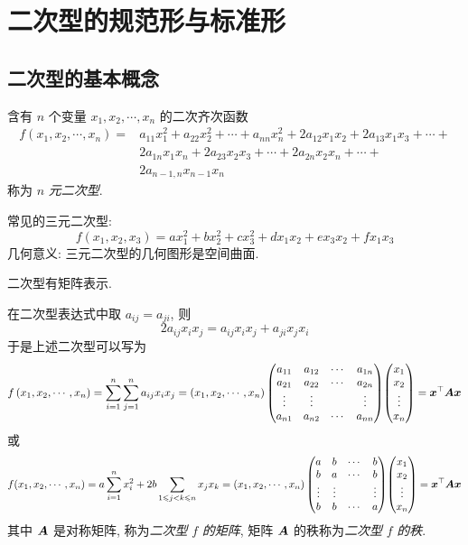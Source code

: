 \section{二次型的规范形与标准形}

\subsection{二次型的基本概念}

\begin{definition}[$n$ 元二次型]
    含有 $ n $ 个变量 $ x_{1}, x_{2}, \cdots, x_{n} $ 的二次齐次函数
    $$\begin{aligned}
            f\left(x_{1}, x_{2}, \cdots, x_{n}\right)= & a_{11} x_{1}^{2}+a_{22} x_{2}^{2}+\cdots+a_{n n} x_{n}^{2}+2 a_{12} x_{1} x_{2}+2 a_{13} x_{1} x_{3}+\cdots+ \\
                                                       & 2 a_{1 n} x_{1} x_{n}+2 a_{23} x_{2} x_{3}+\cdots+2 a_{2 n} x_{2} x_{n}+\cdots+                              \\
                                                       & 2 a_{n-1, n} x_{n-1} x_{n}
        \end{aligned}$$
    称为 $ n $ \textit{元二次型}.
\end{definition}

常见的三元二次型:
$$f\left(x_{1}, x_{2}, x_{3}\right)= a x_{1}^{2}+b x_{2}^{2}+c x_{3}^{2}+d x_{1} x_{2}+e x_{3} x_{2}+f x_{1} x_{3}$$
几何意义: 三元二次型的几何图形是空间曲面.

二次型有矩阵表示.

\begin{definition}[二次型的矩阵表达]
    在二次型表达式中取 $ a_{i j}=a_{j i} $, 则
    $$2 a_{i j} x_{i} x_{j}=a_{i j} x_{i} x_{j}+a_{j i} x_{j} x_{i}$$
    于是上述二次型可以写为
    $$f\left(x_{1}, x_{2}, \cdots, x_{n}\right)=\sum_{i=1}^{n} \sum_{j=1}^{n} a_{i j} x_{i} x_{j}=
        \left(x_{1}, x_{2}, \cdots, x_{n}\right)
        \mqty(a_{11} & a_{12} & \cdots & a_{1 n} \\
        a_{21} & a_{22} & \cdots & a_{2 n} \\
        \vdots & \vdots & & \vdots \\
        a_{n 1} & a_{n 2} & \cdots & a_{n n})
        \mqty(x_{1} \\    x_{2} \\    \vdots \\    x_{n})
        =\vb*{x}^\top \vb*{A} \vb*{x} $$
    或
    $$f(x_1,x_2,\cdots,x_n)=a\sum_{i=1}^{n}x_i^2+2b\sum_{1\leqslant j<k\leqslant n}x_jx_k=
        \left(x_{1}, x_{2}, \cdots, x_{n}\right)
        \mqty(a & b & \cdots & b \\
        b & a & \cdots & b \\
        \vdots & \vdots & & \vdots \\
        b & b & \cdots & a)
        \mqty(x_{1} \\    x_{2} \\    \vdots \\    x_{n})
        =\vb*{x}^\top \vb*{A} \vb*{x}$$
    其中 $ \vb*{A} $ 是对称矩阵, 称为\textit{二次型} $ f $ \textit{的矩阵},
    矩阵 $ \vb*{A} $ 的秩称为\textit{二次型} $ f $ \textit{的秩}.
\end{definition}

